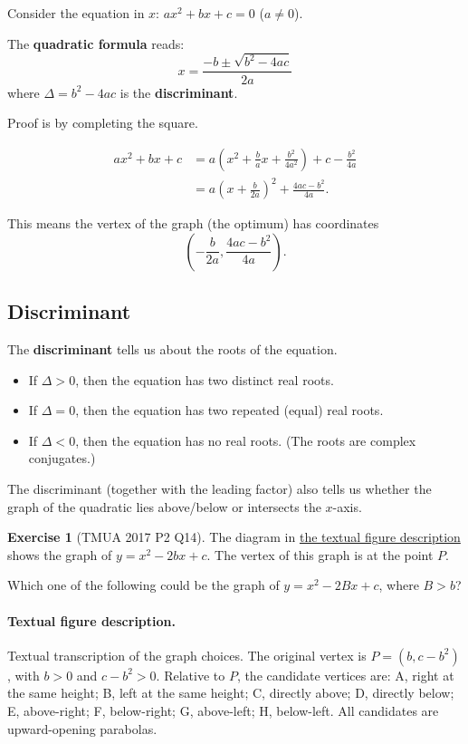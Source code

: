 \documentclass[11pt]{article}
\theoremstyle{definition}
\newtheorem{example}[theorem]{Exercise}
\theoremstyle{remark}
\newcommand{\pqty}[1]{\left(#1\right)}
\begin{document}
Consider the equation in \(x\): \(a x^2 + bx + c = 0\) (\(a \neq 0\)).

The \textbf{quadratic formula} reads:
\[
    x = \frac{-b \pm \sqrt{b^2 - 4ac}}{2a}
\]
where \(\Delta = b^2 - 4ac\) is the \textbf{discriminant}.

Proof is by completing the square.

\begin{align*}
    a x^2 + bx + c &= a \pqty{x^2 + \frac{b}{a} x + \frac{b^2}{4 a^2}} + c - \frac{b^2}{4a} \\
    &= a \pqty{x + \frac{b}{2a}}^2 + \frac{4ac - b^2}{4a}.
\end{align*}

This means the vertex of the graph (the optimum) has coordinates
\[
    \pqty{- \frac{b}{2a}, \frac{4ac - b^2}{4a}}.
\]

\subsection{Discriminant}\label{tmua-1-subsection-004}
The \textbf{discriminant} tells us about the roots of the equation.
\begin{itemize}
    \item If \(\Delta > 0\), then the equation has two distinct real roots.
    \item If \(\Delta = 0\), then the equation has two repeated (equal) real roots.
    \item If \(\Delta < 0\), then the equation has no real roots. (The roots are complex conjugates.)
\end{itemize}

The discriminant (together with the leading factor) also tells us whether the graph of the quadratic lies above/below or intersects the \(x\)-axis.

\begin{example}[TMUA 2017 P2 Q14]\label{tmua-1-unit-016}
    The diagram in \hyperref[fig:tmua-2017-p2-q14]{the textual figure description} shows the graph of \(y = x^2 - 2bx + c\). The vertex of this graph is at the point \(P\).

    Which one of the following could be the graph of \(y = x^2 - 2Bx + c\), where \(B > b\)?
\end{example}

\paragraph{Textual figure description.}\label{fig:tmua-2017-p2-q14}
Textual transcription of the graph choices. The original vertex is \(P=(b,c-b^2)\), with \(b>0\) and \(c-b^2>0\). Relative to \(P\), the candidate vertices are: A, right at the same height; B, left at the same height; C, directly above; D, directly below; E, above-right; F, below-right; G, above-left; H, below-left. All candidates are upward-opening parabolas.
\end{document}
